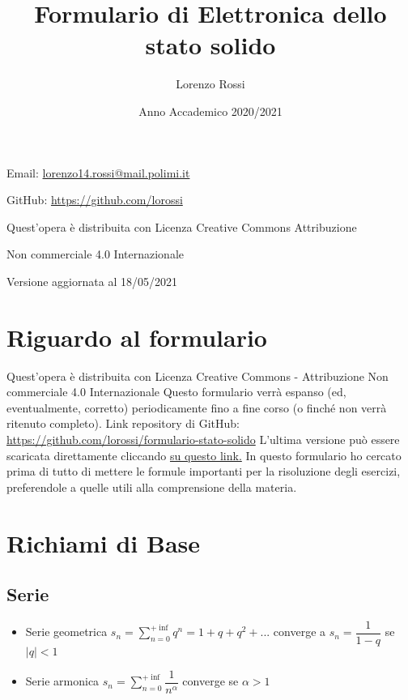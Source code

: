 \documentclass{article}
\title{\Huge Formulario di Elettronica dello stato solido}
\author{\LARGE Lorenzo Rossi}
\date{\LARGE Anno Accademico 2020/2021}
\begin{document}
\maketitle

\vspace{18em}

\large
\begin{doublespacing}\hypersetup{
    urlcolor=black,
  }
  \centerline{Email: \href{mailto://lorenzo14.rossi@mail.polimi.it}{lorenzo14.rossi@mail.polimi.it}}
  \centerline{GitHub: \url{https://github.com/lorossi}}

  \vspace{18em}
  \centerline{Quest'opera è distribuita con Licenza Creative Commons Attribuzione}
  \centerline{Non commerciale 4.0 Internazionale \ccbynceu}
  \centerline{Versione aggiornata al 18/05/2021}
\end{doublespacing}
\newpage


\tableofcontents
\clearpage
{}
\newpage

\section{Riguardo al formulario}
Quest'opera è distribuita con Licenza Creative Commons - Attribuzione Non commerciale 4.0 Internazionale \ccbynceu \newline
Questo formulario verrà espanso (ed, eventualmente, corretto) periodicamente fino a fine corso (o finché non verrà ritenuto completo). \newline
Link repository di GitHub: \url{https://github.com/lorossi/formulario-stato-solido} \newline
L'ultima versione può essere scaricata direttamente cliccando \href{https://github.com/lorossi/formulario-stato-solido/raw/master/formulario-elettronica-dello-stato-solido.pdf}{su questo link.} \newline
In questo formulario ho cercato prima di tutto di mettere le formule importanti per la risoluzione degli esercizi, preferendole a quelle utili alla comprensione della materia.

\newpage

\section{Richiami di Base}
\subsection{Serie}
\begin{itemize}
  \item Serie geometrica \( \displaystyle  s_n = \sum_{n=0}^{+\inf} q^n = 1 + q + q^2 + ... \) converge a \( s_n = \dfrac{1}{1-q} \) se \( |q| < 1 \)
  \item Serie armonica \( \displaystyle s_n = \sum_{n=0}^{+\inf} \dfrac{1}{n ^ \alpha} \) converge se \( \alpha > 1 \)
\end{itemize}
\end{document}
